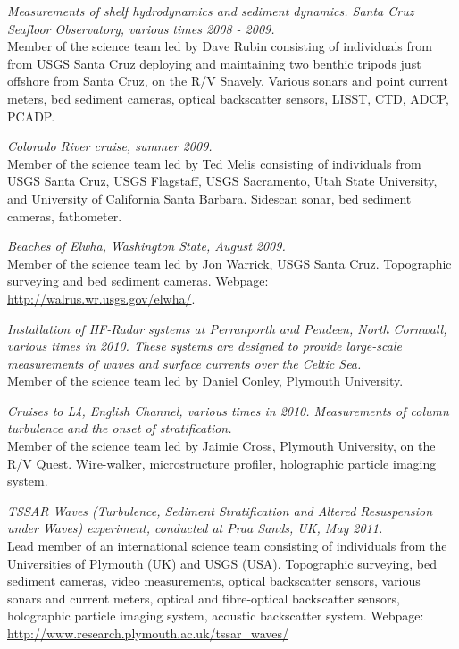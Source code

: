 \documentclass[margin,line]{resume}
\begin{document}
\begin{resume}
\begin{footnotesize}
    {\sl Measurements of shelf hydrodynamics and sediment dynamics. Santa Cruz Seafloor Observatory, various times 2008 - 2009.} \\
    Member of the science team led by Dave Rubin consisting of individuals from from USGS Santa Cruz deploying and maintaining two benthic tripods just offshore from Santa Cruz, on the R/V Snavely. Various sonars and point current meters, bed sediment cameras, optical backscatter sensors, LISST, CTD, ADCP, PCADP.

    {\sl Colorado River cruise, summer 2009.} \\
    Member of the science team led by Ted Melis consisting of individuals from USGS Santa Cruz, USGS Flagstaff, USGS Sacramento, Utah State University, and University of California Santa Barbara. Sidescan sonar, bed sediment cameras, fathometer.

    {\sl Beaches of Elwha, Washington State, August 2009.} \\
    Member of the science team led by Jon Warrick, USGS Santa Cruz. Topographic surveying and bed sediment cameras. Webpage: \url{http://walrus.wr.usgs.gov/elwha/}. 

    {\sl Installation of HF-Radar systems at Perranporth and Pendeen, North Cornwall, various times in 2010. These systems are designed to provide large-scale measurements of waves and surface currents over the Celtic Sea.} \\
    Member of the science team led by Daniel Conley, Plymouth University.

    {\sl Cruises to L4, English Channel, various times in 2010. Measurements of column turbulence and the onset of stratification.} \\
    Member of the science team led by Jaimie Cross, Plymouth University, on the R/V Quest. Wire-walker, microstructure profiler, holographic particle imaging system.

    {\sl TSSAR Waves (Turbulence, Sediment Stratification and Altered Resuspension under Waves) experiment, conducted at Praa Sands, UK, May 2011.} \\
    Lead member of an international science team consisting of individuals from the Universities of Plymouth (UK) and USGS (USA). Topographic surveying, bed sediment cameras, video measurements, optical backscatter sensors, various sonars and current meters, optical and fibre-optical backscatter sensors, holographic particle imaging system, acoustic backscatter system. Webpage: \url{http://www.research.plymouth.ac.uk/tssar_waves/}


\end{footnotesize}
\end{resume}
\end{document}
